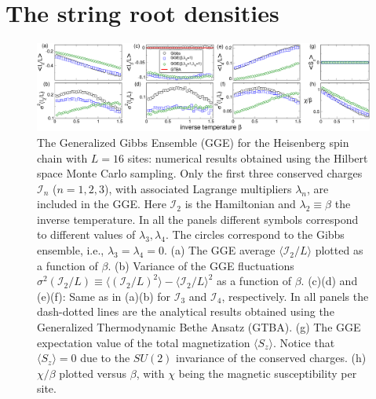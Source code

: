 \documentclass[twocolumn,superscriptaddress,prb,10pt]{revtex4-1}
\begin{document}
\section{The string root densities}


\begin{figure}[t]
\includegraphics*[width=0.93\linewidth]{./draft_figs/fig1}
\caption{The Generalized Gibbs Ensemble (GGE) for the Heisenberg spin chain with 
 $L=16$ sites: numerical results obtained using the Hilbert space Monte 
 Carlo sampling. Only the first three conserved charges ${\mathcal I}_n$ ($n=1,2,3$), 
 with associated Lagrange multipliers $\lambda_n$, are included in the GGE. Here 
 ${\mathcal I}_2$ is the Hamiltonian and $\lambda_2\equiv\beta$ the inverse 
 temperature. In all the panels different symbols correspond to different  values 
 of $\lambda_3,\lambda_4$. The circles correspond to the Gibbs ensemble, i.e., 
 $\lambda_3=\lambda_4=0$. (a) The GGE average $\langle {\mathcal I}_2/L\rangle$ 
 plotted as a function of $\beta$. (b) Variance of the GGE fluctuations $\sigma^2(
 {\mathcal I}_2/L)\equiv \langle ({\mathcal I}_2/L)^2\rangle-\langle {\mathcal I}_2/L
 \rangle^2$ as a function of $\beta$. (c)(d) and (e)(f): Same as in (a)(b) for 
 ${\mathcal I}_3$ and ${\mathcal I}_4$, respectively. In all panels the dash-dotted 
 lines  are the analytical results obtained using the Generalized Thermodynamic Bethe 
 Ansatz (GTBA). (g) The GGE expectation value of the total magnetization 
 $\langle S_z\rangle$. Notice that $\langle S_z\rangle=0$ due to the $SU(2)$ 
 invariance of the conserved charges. (h) $\chi/\beta$ plotted versus $\beta$, with 
 $\chi$ being the magnetic susceptibility per site. 
}
\label{fig1}
\end{figure}
\end{document}
